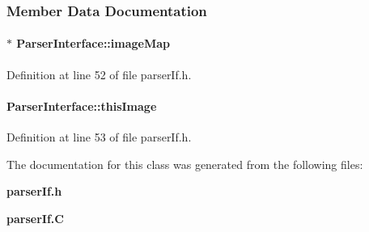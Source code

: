 \subsubsection{Member Data Documentation}
\label{ParserInterface_o0}
\paragraph{ $\ast$ Parser\-Interface::image\-Map\hspace{0.3cm}{\tt  [private]}}\hfill



Definition at line 52 of file parser\-If.h.\label{ParserInterface_o1}
\paragraph{ Parser\-Interface::this\-Image\hspace{0.3cm}{\tt  [private]}}\hfill



Definition at line 53 of file parser\-If.h.

The documentation for this class was generated from the following files:\begin{CompactItemize}
\item 
{\bf parser\-If.h}\item 
{\bf parser\-If.C}\end{CompactItemize}
